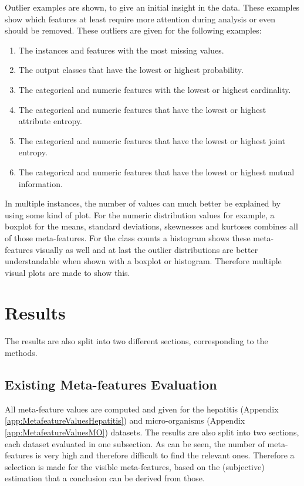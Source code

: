 \documentclass[10pt,a4paper]{article}
\begin{document}
	Outlier examples are shown, to give an initial insight in the data. These examples show which features at least require more attention during analysis or even should be removed. These outliers are given for the following examples:
	
	\begin{enumerate}
		\item The instances and features with the most missing values.
		\item The output classes that have the lowest or highest probability.
		\item The categorical and numeric features with the lowest or highest cardinality.
		\item The categorical and numeric features that have the lowest or highest attribute entropy.
		\item The categorical and numeric features that have the lowest or highest joint entropy.
		\item The categorical and numeric features that have the lowest or highest mutual information.
	\end{enumerate}	
	
	In multiple instances, the number of values can much better be explained by using some kind of plot. For the numeric distribution values for example, a boxplot for the means, standard deviations, skewnesses and kurtoses combines all of those meta-features. For the class counts a histogram shows these meta-features visually as well and at last the outlier distributions are better understandable when shown with a boxplot or histogram. Therefore multiple visual plots are made to show this.
		
	\section{Results}
	\label{sec:Results}
	
	The results are also split into two different sections, corresponding to the methods.
	
	\subsection{Existing Meta-features Evaluation}
	\label{subsec:ResultsExistingEvaluation}
	
	All meta-feature values are computed and given for the hepatitis (Appendix \ref{app:MetafeatureValuesHepatitis}) and micro-organisms (Appendix \ref{app:MetafeatureValuesMO}) datasets. The results are also split into two sections, each dataset evaluated in one subsection. As can be seen, the number of meta-features is very high and therefore difficult to find the relevant ones. Therefore a selection is made for the visible meta-features, based on the (subjective) estimation that a conclusion can be derived from those. 
	
\end{document}
